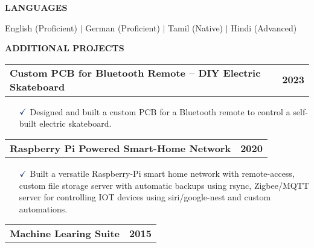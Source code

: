 \documentclass[a4paper,10pt]{article}
\begin{document}
\noindent{\rule{\linewidth}{1.4pt}}
\textbf{LANGUAGES}

\vspace{-0.1cm}
\noindent{\rule{\linewidth}{0.01cm}}

\noindent English (Proficient) {$\vert$} German (Proficient) $\vert$ Tamil (Native) $\vert$ Hindi (Advanced)

\noindent{\rule{\linewidth}{1.4pt}}
\textbf{ADDITIONAL PROJECTS}

\vspace{-0.1cm}
\noindent{\rule{\linewidth}{0.01cm}}

\vspace{0.3cm}
\noindent
\begin{tabular}{ @{\hskip 0pt}m{} >{\raggedleft\arraybackslash}p{} }
    \noindent\textbf{Custom PCB for Bluetooth Remote – DIY Electric Skateboard} & \textbf{2023}
\end{tabular}

{\small
\begin{itemize}
    \item[$\textcolor{highlightcolor}{\checkmark}$]  
    Designed and built a custom PCB for a Bluetooth remote to control a self-built electric skateboard.
\end{itemize}
}

\vspace{0.3cm}
\noindent
\begin{tabular}{ @{\hskip 0pt}m{} >{\raggedleft\arraybackslash}p{} }
    \noindent\textbf{Raspberry Pi Powered Smart-Home Network} & \textbf{2020}
\end{tabular}

{\small
\begin{itemize}
    \item[$\textcolor{highlightcolor}{\checkmark}$]  
            Built a versatile Raspberry-Pi smart home network with
            remote-access, custom file storage server with automatic backups
            using rsync, Zigbee/MQTT server for controlling IOT devices using
            siri/google-nest and custom automations.
\end{itemize}
}

\vspace{0.3cm}
\noindent
\begin{tabular}{ @{\hskip 0pt}m{} >{\raggedleft\arraybackslash}p{} }
    \noindent\textbf{Machine Learing Suite} & \textbf{2015}
\end{tabular}
\end{document}
